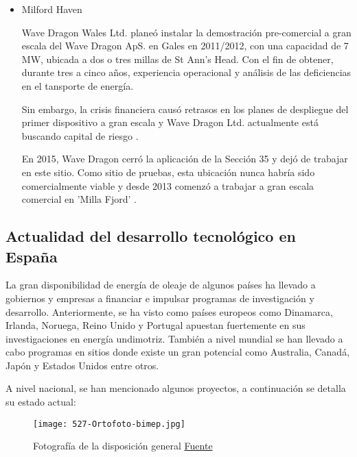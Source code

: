 \begin{itemize}
\begin{itemize}
    

  \item
    Milford Haven

    Wave Dragon Wales Ltd. planeó instalar la demostración pre-comercial
    a gran escala del Wave Dragon ApS. en Gales en 2011/2012, con una
    capacidad de 7 MW, ubicada a dos o tres millas de St Ann's Head. Con
    el fin de obtener, durante tres a cinco años, experiencia
    operacional y análisis de las deficiencias en el tansporte de
    energía.

    Sin embargo, la crisis financiera causó retrasos en los planes de
    despliegue del primer dispositivo a gran escala y Wave Dragon Ltd.
    actualmente está buscando capital de riesgo \cite{wavedragon09}.
   

    En 2015, Wave Dragon cerró la aplicación de la Sección 35 y dejó de
    trabajar en este sitio. Como sitio de pruebas, esta ubicación nunca
    habría sido comercialmente viable y desde 2013 comenzó a trabajar a
    gran escala comercial en 'Milla Fjord' \cite{oes09}.
    
  \end{itemize}
\end{itemize}

\subsection{Actualidad del desarrollo tecnológico en España}\label{header-n430}

La gran disponibilidad de energía de oleaje de algunos países ha llevado
a gobiernos y empresas a financiar e impulsar programas de investigación
y desarrollo. Anteriormente, se ha visto como países europeos como
Dinamarca, Irlanda, Noruega, Reino Unido y Portugal apuestan fuertemente
en sus investigaciones en energía undimotriz. También a nivel mundial se
han llevado a cabo programas en sitios donde existe un gran potencial
como Australia, Canadá, Japón y Estados Unidos entre otros.

A nivel nacional, se han mencionado algunos proyectos, a continuación se
detalla su estado actual:

\begin{figure}
\centering
\texttt{[image: 527-Ortofoto-bimep.jpg]}
\caption[Fotografía de la disposición general]{Fotografía de la disposición general \href{http://bimep.com/sobre-bimep/localizacion-de-bimep/}{Fuente}}
\label{fig:Ortofoto-bimep}
\end{figure}

